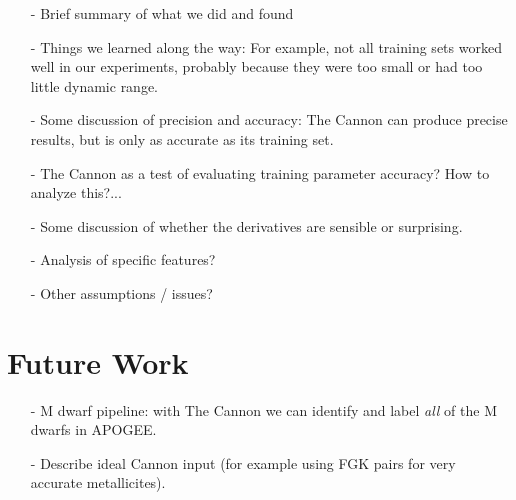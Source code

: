 \documentclass[modern]{aastex62}
\begin{document}
\begin{enumerate}
\item[-] Brief summary of what we did and found

\item[-] Things we learned along the way: For example, not all training sets worked well in our experiments, probably because they were too small or had too little dynamic range.

\item[-] Some discussion of precision and accuracy: The Cannon can produce precise results, but is only as accurate as its training set. 

\item[-] The Cannon as a test of evaluating training parameter accuracy? How to analyze this?... \color{red}{Maybe add training on theoretical models? Could be a test of seeing how well The Cannon could derive labels if there was a "ground truth" and tell us limitations of The Cannon model (i.e. we could say, for input spectra with zero label uncertainty, The Cannon can reproduce flux at each pixel with less than $XX\%$ error (comment on how well The Cannon reconstructs important features), and can reproduce labels to $XX\%$ uncertainty). Compare this to Mann and other traiing sets. Not hard to add, but having some issues with continuum normalization.}\color{black}

\item[-] Some discussion of whether the derivatives are sensible or surprising. \color{red}{Add derivative plots.}\color{black}

\item[-] Analysis of specific features? \color{red}{Can easily plot some line lists, but not sure where to go with the analysis... What features are important for M dwarfs? Compare derivative plots of specific lines between theory-trained models and data-trained models?}\color{black}

\item[-] Other assumptions / issues?
\end{enumerate}

\section{Future Work} \label{sec:future}

\begin{enumerate}
\item[-] M dwarf pipeline: with The Cannon we can identify and label \emph{all} of the M dwarfs in APOGEE.
\item[-] Describe ideal Cannon input (for example using FGK pairs for very accurate metallicites).
\end{enumerate}
\end{document}
